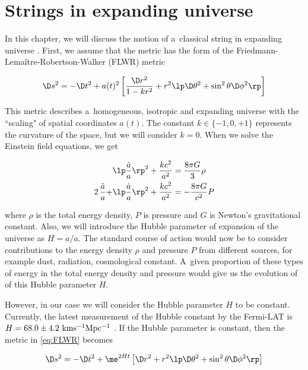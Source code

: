 
\chapter{Strings in expanding universe}


In this chapter, we will discuss the motion of a~classical string in expanding universe \cite{zwiebach}. First, we assume that the metric has the form of the Friedmann-Lema\^{i}tre-Robertson-Walker (FLWR) metric

\begin{equation}
\label{eq:FLWR}
    \D s^2 = -\D t^2 + a(t)^2 \left[ \frac{\D r^2}{1-k r^2} + r^2 \lp \D \theta^2 + \sin^2 \theta \D \phi^2 \rp \right]
\end{equation}

\noindent
This metric describes a~homogeneous, isotropic and expanding universe with the ``scaling" of spatial coordinates $a(t)$. The constant $k \in \{-1, 0, +1\}$ represents the curvature of the space, but we will consider $k = 0$. When we solve the Einstein field equations, we get

\begin{align}
    &\lp \frac{\dot{a}}{a} \rp ^2 + \frac{k c^2}{a^2} = \frac{8 \pi G}{3} \rho \\
    2 \, \frac{\ddot{a}}{a} + & \lp \frac{\dot{a}}{a} \rp ^2 + \frac{k c^2}{a^2} = -\frac{8 \pi G}{c^2}P
\end{align}

\noindent
where $\rho$ is the total energy density, $P$ is pressure and $G$ is Newton's gravitational constant. Also, we will introduce the Hubble parameter of expansion of the universe as $H = \dot{a}/a$. The standard course of action would now be to consider contributions to the energy density $\rho$ and pressure $P$ from different sources, for example dust, radiation, cosmological constant. A~given proportion of these types of energy in the total energy density and pressure would give us the evolution of of this Hubble parameter $H$.

However, in our case we will consider the Hubble parameter $H$ to be constant. Currently, the latest measurement of the Hubble constant by the Fermi-LAT is $H = 68.0 \pm 4.2 ~ \rm{km s^{-1} Mpc^{-1}}$ \cite{hubble}. If the Hubble parameter is constant, then the metric in \cref{eq:FLWR} becomes

\begin{equation}
    \D s^2 = - \D t^2 + \me^{2Ht} \left[ \D r^2 + r^2 \lp \D \theta^2 + \sin^2{\theta}\D \phi^2 \rp \right]
\end{equation}

